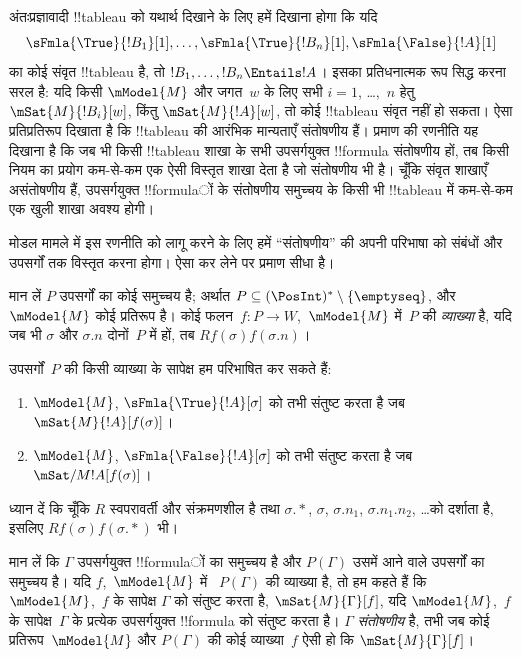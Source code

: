 \documentclass[../../../include/open-logic-section]{subfiles}
\begin{document}


\begin{explain}
  अंतःप्रज्ञावादी !!{tableau} को यथार्थ दिखाने के लिए हमें दिखाना होगा कि यदि
  \[
  \sFmla{\True}{!B_1}[1], \dots, \sFmla{\True}{!B_n}[1], \sFmla{\False}{!A}[1]
  \]
  का कोई संवृत !!{tableau} है, तो $!B_1, \dots, !B_n \Entails !A$। इसका
  प्रतिधनात्मक रूप सिद्ध करना सरल है: यदि किसी $\mModel{M}$ और जगत~$w$ के
  लिए सभी $i=1$, \dots,~$n$ हेतु $\mSat{M}{!B_i}[w]$, किंतु
  $\mSat{M}{!A}[w]$, तो कोई !!{tableau} संवृत नहीं हो सकता। ऐसा प्रतिप्रतिरूप
  दिखाता है कि !!{tableau} की आरंभिक मान्यताएँ संतोषणीय हैं। प्रमाण की रणनीति
  यह दिखाना है कि जब भी किसी !!{tableau} शाखा के सभी उपसर्गयुक्त !!{formula}
  संतोषणीय हों, तब किसी नियम का प्रयोग कम-से-कम एक ऐसी विस्तृत शाखा देता है
  जो संतोषणीय भी है। चूँकि संवृत शाखाएँ असंतोषणीय हैं, उपसर्गयुक्त !!{formula}ों
  के संतोषणीय समुच्चय के किसी भी !!{tableau} में कम-से-कम एक खुली शाखा अवश्य
  होगी।

  मोडल मामले में इस रणनीति को लागू करने के लिए हमें ``संतोषणीय'' की अपनी
  परिभाषा को संबंधों और उपसर्गों तक विस्तृत करना होगा। ऐसा कर लेने पर प्रमाण
  सीधा है।
\end{explain}

\begin{defn}
  मान लें $P$ उपसर्गों का कोई समुच्चय है; अर्थात
  $P \subseteq (\PosInt)^* \setminus \{\emptyseq\}$, और $\mModel{M}$ कोई
  प्रतिरूप है। कोई फलन~$f\colon P \to W$,~$\mModel{M}$ में~$P$ की
  \emph{व्याख्या} है, यदि जब भी $\sigma$ और $\sigma.n$ दोनों~$P$ में हों,
  तब $Rf(\sigma)f(\sigma.n)$।

  उपसर्गों~$P$ की किसी व्याख्या के सापेक्ष हम परिभाषित कर सकते हैं:
  \begin{enumerate}
  \item $\mModel{M}$, $\sFmla{\True}{!A}[\sigma]$ को तभी संतुष्ट करता है
    जब $\mSat{M}{!A}[f(\sigma)]$।
  \item $\mModel{M}$, $\sFmla{\False}{!A}[\sigma]$ को तभी संतुष्ट करता है
    जब $\mSat/{M}{!A}[f(\sigma)]$।
  \end{enumerate}
\end{defn}

ध्यान दें कि चूँकि $R$ स्वपरावर्ती और संक्रमणशील है तथा $\sigma.{*}$,
$\sigma$, $\sigma.n_1$, $\sigma.n_1.n_2$, \dots को दर्शाता है, इसलिए
$Rf(\sigma)f(\sigma.{*})$ भी।

\begin{defn}
  मान लें कि $\Gamma$ उपसर्गयुक्त !!{formula}ों का समुच्चय है और $P(\Gamma)$
  उसमें आने वाले उपसर्गों का समुच्चय है। यदि $f$,~$\mModel{M}$ में
  ~$P(\Gamma)$ की व्याख्या है, तो हम कहते हैं कि $\mModel{M}$,~$f$ के
  सापेक्ष $\Gamma$ को संतुष्ट करता है, $\mSat{M}{\Gamma}[f]$, यदि
  $\mModel{M}$,~$f$ के सापेक्ष~$\Gamma$ के प्रत्येक उपसर्गयुक्त !!{formula}
  को संतुष्ट करता है। $\Gamma$ \emph{संतोषणीय} है, तभी जब कोई
  प्रतिरूप~$\mModel{M}$ और $P(\Gamma)$ की कोई व्याख्या~$f$ ऐसी हो कि
  $\mSat{M}{\Gamma}[f]$।
\end{defn}
\end{document}
